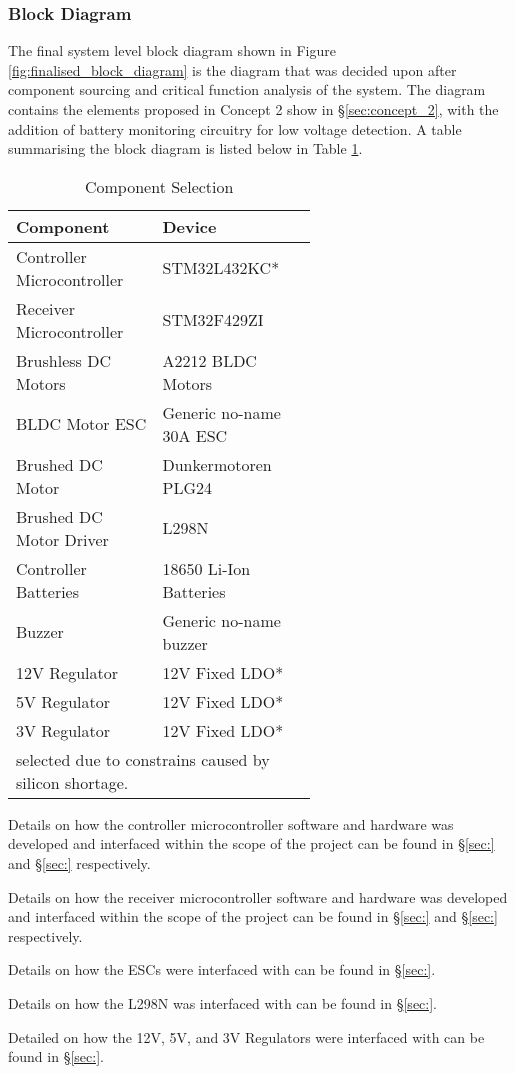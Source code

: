 \documentclass [12pt]{article}
\begin{document}
\subsubsection{Block Diagram}

The final system level block diagram shown in Figure \ref{fig:finalised_block_diagram} is the diagram that was decided upon after component sourcing and critical function analysis of the system. The diagram contains the elements proposed in Concept 2 show in §\ref{sec:concept_2}, with the addition of battery monitoring circuitry for low voltage detection. A table summarising the block diagram is listed below in Table \ref{table:component_selection}.

\begin{table}[H]
\centering
\setlength{\arrayrulewidth}{1.5pt}
\begin{tabular}{|p{0.3\linewidth}|p{0.3\linewidth}|}
\hline
\cellcolor{gray!40}Component & \cellcolor{gray!40}Device \\ 
\hline
Controller Microcontroller  & STM32L432KC* \\
\hline
Receiver Microcontroller   & STM32F429ZI\\
\hline
Brushless DC Motors   & A2212 BLDC Motors \\
\hline
BLDC Motor ESC   & Generic no-name 30A ESC\\
\hline
Brushed DC Motor   & Dunkermotoren PLG24 \\
\hline
Brushed DC Motor Driver  & L298N\\
\hline
Controller Batteries   & 18650 Li-Ion Batteries \\
\hline
Buzzer   & Generic no-name buzzer \\
\hline
12V Regulator & 12V Fixed LDO* \\
\hline
5V Regulator & 12V Fixed LDO*\\
\hline
3V Regulator & 12V Fixed LDO*\\
\hline
\multicolumn{2}{l}{\small *selected due to constrains caused by silicon shortage.} \\
\end{tabular}
\caption{Component Selection}
\label{table:component_selection}
\end{table}


{\parindent0pt


Details on how the controller microcontroller software and hardware was developed and interfaced within the scope of the project can be found in  §\ref{sec:} and §\ref{sec:} respectively.

Details on how the receiver microcontroller software and hardware was developed and interfaced within the scope of the project can be found in  §\ref{sec:} and §\ref{sec:} respectively.

Details on how the ESCs were interfaced with can be found in §\ref{sec:}.

Details on how the L298N was interfaced with can be found in §\ref{sec:}.

Detailed on how the 12V, 5V, and 3V Regulators were interfaced with can be found in §\ref{sec:}.

}
\end{document}
